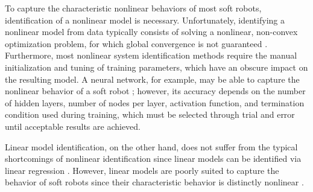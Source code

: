 To capture the characteristic nonlinear behaviors of most soft robots, identification of a nonlinear model is necessary.
Unfortunately, identifying a nonlinear model from data typically consists of solving a nonlinear, non-convex optimization problem, for which global convergence is not guaranteed \cite{boyd2004convex}.
Furthermore, most nonlinear system identification methods require the manual initialization and tuning of training parameters, which have an obscure impact on the resulting model.
A neural network, for example, may be able to capture the nonlinear behavior of a soft robot \cite{gillespie2018learning}; 
however, its accuracy depends on the number of hidden layers, number of nodes per layer, activation function, and termination condition used during training, which must be selected through trial and error until acceptable results are achieved.

Linear model identification, on the other hand, does not suffer from the typical shortcomings of nonlinear identification 
since linear models can be identified via linear regression \cite{ljung1987system}.
However, linear models are poorly suited to capture the behavior of soft robots since their characteristic behavior is distinctly nonlinear \cite{rus2015design}.



